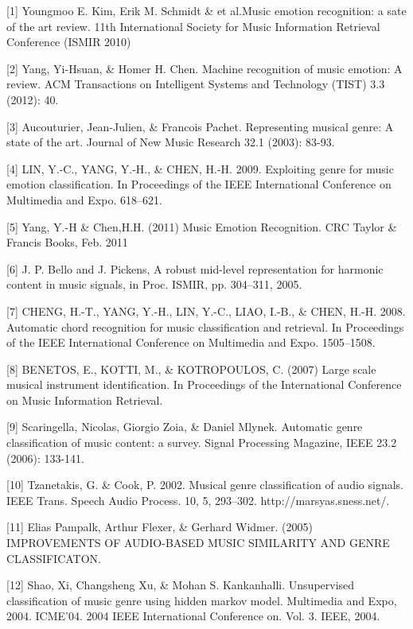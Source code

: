 \documentclass{article} %
\begin{document}
\small{
	
[1] Youngmoo E. Kim, Erik M. Schmidt \& et al.Music emotion recognition: a sate of the art review. 11th International Society for Music Information Retrieval Conference (ISMIR 2010)

[2] Yang, Yi-Hsuan, \& Homer H. Chen. Machine recognition of music emotion: A review. ACM Transactions on Intelligent Systems and Technology (TIST) 3.3 (2012): 40.

[3] Aucouturier, Jean-Julien, \& Francois Pachet. Representing musical genre: A state of the art. Journal of New Music Research 32.1 (2003): 83-93.

[4] LIN, Y.-C., YANG, Y.-H., \& CHEN, H.-H. 2009. Exploiting genre for music emotion classification. In Proceedings of the IEEE International Conference on Multimedia and Expo. 618–621.

[5] Yang, Y.-H \& Chen,H.H. (2011) Music Emotion Recognition. CRC Taylor \& Francis Books, Feb. 2011

[6] J. P. Bello and J. Pickens, A robust mid-level representation for harmonic content in music signals, in Proc. ISMIR, pp. 304–311, 2005. 

[7] CHENG, H.-T., YANG, Y.-H., LIN, Y.-C., LIAO, I.-B., \& CHEN, H.-H. 2008. Automatic chord recognition for music classification and retrieval. In Proceedings of the IEEE International Conference on Multimedia and Expo. 1505–1508.

[8] BENETOS, E., KOTTI, M., \& KOTROPOULOS, C. (2007) Large scale musical instrument identification. In Proceedings of the International Conference on Music Information Retrieval.

[9] Scaringella, Nicolas, Giorgio Zoia, \& Daniel Mlynek. Automatic genre classification of music content: a survey. Signal Processing Magazine, IEEE 23.2 (2006): 133-141.

[10] Tzanetakis, G. \& Cook, P. 2002. Musical genre classification of audio signals. IEEE Trans. Speech Audio Process. 10, 5, 293–302. http://marsyas.sness.net/.

[11] Elias Pampalk, Arthur Flexer, \& Gerhard Widmer. (2005) IMPROVEMENTS OF AUDIO-BASED MUSIC SIMILARITY AND GENRE CLASSIFICATON.

[12] Shao, Xi, Changsheng Xu, \& Mohan S. Kankanhalli. Unsupervised classification of music genre using hidden markov model. Multimedia and Expo, 2004. ICME'04. 2004 IEEE International Conference on. Vol. 3. IEEE, 2004.

}
\end{document}
